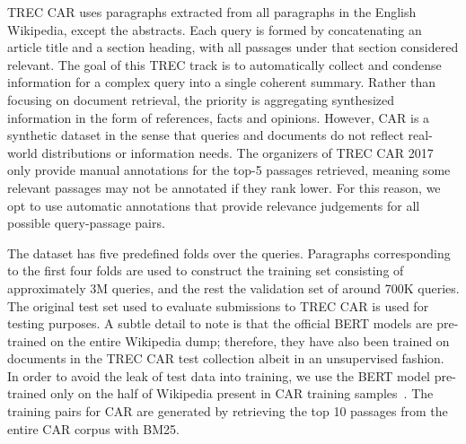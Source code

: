 
TREC CAR \cite{dietz2017trec} uses paragraphs extracted from all paragraphs in the English Wikipedia, except the abstracts.
Each query is formed by concatenating an article title and a section heading, with all passages under that section considered relevant.
The goal of this TREC track is to automatically collect and condense information for a complex query into a single coherent summary.
Rather than focusing on document retrieval, the priority is aggregating synthesized information in the form of references, facts and opinions.
However, CAR is a synthetic dataset in the sense that queries and documents do not reflect real-world distributions or information needs.
The organizers of TREC CAR 2017 only provide manual annotations for the top-5 passages retrieved, meaning some relevant passages may not be annotated if they rank lower.
For this reason, we opt to use automatic annotations that provide relevance judgements for all possible query-passage pairs.

The dataset has five predefined folds over the queries.
Paragraphs corresponding to the first four folds are used to construct the training set consisting of approximately 3M queries, and the rest the validation set of around 700K queries.
The original test set used to evaluate submissions to TREC CAR is used for testing purposes.
A subtle detail to note is that the official BERT models are pre-trained on the entire Wikipedia dump; therefore, they have also been trained on documents in the TREC CAR test collection albeit in an unsupervised fashion.
In order to avoid the leak of test data into training, we use the BERT model pre-trained only on the half of Wikipedia present in CAR training samples~\cite{nogueira2019passage}.
The training pairs for CAR are generated by retrieving the top 10 passages from the entire CAR corpus with BM25.

